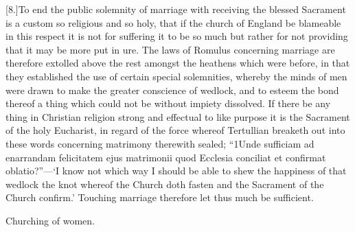 [8.]To end the public solemnity of marriage with receiving the blessed Sacrament is a custom so religious and so holy, that if the church of England be blameable in this respect it is not for suffering it to be so much but rather for not providing that it may be more put in ure. The laws of Romulus concerning marriage are therefore extolled above the rest  amongst the heathens which were before,
 in that they established the use of certain special solemnities, whereby the minds of men were drawn to make the greater conscience of wedlock, and to esteem the bond thereof a thing which could not be without impiety dissolved. If there be any thing in Christian religion strong and effectual to like purpose it is the Sacrament of the holy Eucharist, in regard of the force whereof Tertullian breaketh out into these words concerning matrimony therewith sealed; “1Unde sufficiam ad enarrandam felicitatem ejus matrimonii quod Ecclesia conciliat et confirmat oblatio?”—‘I know not which way I should be able to shew the happiness of that wedlock the knot whereof the Church doth fasten and the Sacrament of the Church confirm.’ Touching marriage therefore let thus much be sufficient.


Churching of women.
